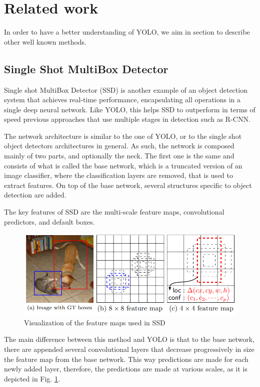 \section{Related work} \label{related_work}

In order to have a better understanding of YOLO, we aim in section to describe other well known methods.

\subsection{Single Shot MultiBox Detector}

Single shot MultiBox Detector (SSD) \cite{ssd} is another example of an object detection system that achieves real-time performance, encapsulating all operations in a single deep neural network. Like YOLO, this helps SSD to outperform in terms of speed previous approaches that use multiple stages in detection such as R-CNN. 
     
The network architecture is similar to the one of YOLO, or to the single shot object detectors architectures in general. As such, the network is composed mainly of two parts, and optionally the neck. The first one is the same and consists of what is called the base network, which is a truncated version of an image classifier, where the classification layers are removed, that is used to extract features. On top of the base network, several structures specific to object detection are added.
        
The key features of SSD are the multi-scale feature maps, convolutional predictors, and default boxes. 
        
        \begin{figure}[h]
          \centering
          \includegraphics[scale=0.6]{images/ssd.png}
          \caption{Visualization of the feature maps used in SSD \cite{ssd}}
          \label{ssdImg}
        \end{figure}
        
The main difference between this method and YOLO is that to the base network, there are appended several convolutional layers that decrease progressively in size the feature map from the base network. This way predictions are made for each newly added layer, therefore, the predictions are made at various scales, as it is depicted in Fig. \ref{ssdImg}. 
        
